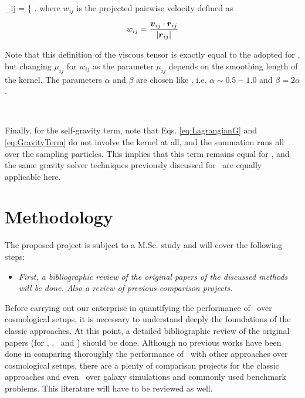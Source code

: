 \documentclass[a4,useAMS,usenatbib,usegraphicx,12pt]{article}
\begin{document}
{ \Pi_{ij} = \left\{ \right. }
where $w_{ij}$ is the projected pairwise velocity defined as

\[ w_{ij} = \frac{ \boldsymbol{ v }_{ij}\cdot \boldsymbol{ r }_{ij} }{|\boldsymbol{ r }_{ij}|} \]

Note that this definition of the viscous tensor is exactly equal to the adopted 
for \SPH, but changing $\mu_{ij}$ for $w_{ij}$ as the parameter $\mu_{ij}$ 
depends on the smoothing length of the kernel. The parameters $\alpha$ and 
$\beta$ are chosen like \SPH, i.e. $\alpha \sim 0.5-1.0$ and $\beta = 2\alpha$.

\

Finally, for the self-gravity term, note that Eqs. \ref{eq:LagrangianG} and 
\ref{eq:GravityTerm} do not involve the kernel at all, and the summation runs
all over the sampling particles. This implies that this term remains equal for 
\VPH, and the same gravity solver techniques previously discussed for \SPH\ are
equally applicable here.

\section{Methodology}
The proposed project is subject to a M.Sc. study and will cover the following 
steps:


\begin{itemize}
\item[\checkmark] \textit{First, a bibliographic review of the original papers 
of the discussed methods will be done. Also a review of previous comparison 
projects.}
\end{itemize}


Before carrying out our enterprise in quantifying the performance of \VPH\ over
cosmological setups, it is necessary to understand deeply the foundations of 
the classic approaches. At this point, a detailed bibliographic review of the 
original papers (for \SPH, \AMR, \VPH\ and \AREPO) should be done. Although no 
previous works have been done in comparing thoroughly the performance of \VPH\
with other approaches over cosmological setups, there are a plenty of comparison
projects for the classic approaches and even \AREPO\ over galaxy simulations and 
commonly used benchmark problems. This literature will have to be reviewed as 
well.
\end{document}
